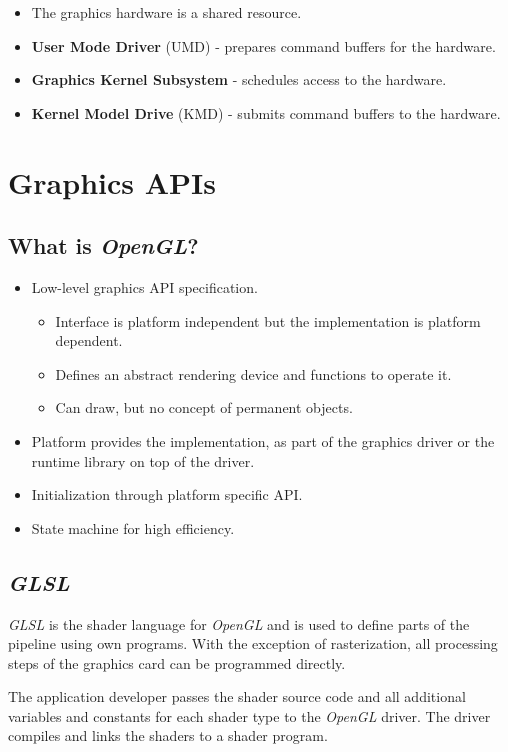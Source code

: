 \documentclass[11pt]{article}
\begin{document}
\begin{itemize}
  \item The graphics hardware is a shared resource.
  \item \textbf{User Mode Driver} (UMD) - prepares command buffers for the hardware.
  \item \textbf{Graphics Kernel Subsystem} - schedules access to the hardware.
  \item \textbf{Kernel Model Drive} (KMD) - submits command buffers to the hardware.
\end{itemize}

\section{Graphics APIs}
\subsection{What is \textit{OpenGL}?}
\begin{itemize}
  \item Low-level graphics API specification.
    \begin{itemize}
      \item Interface is platform independent but the implementation is platform dependent.
      \item Defines an abstract rendering device and functions to operate it.
      \item Can draw, but no concept of permanent objects.
    \end{itemize}
  \item Platform provides the implementation, as part of the graphics driver or the runtime library on top of the driver.
  \item Initialization through platform specific API.
  \item State machine for high efficiency.
\end{itemize}

\subsection{\textit{GLSL}}
\textit{GLSL} is the shader language for \textit{OpenGL} and is used to define parts of the pipeline using own programs.
With the exception of rasterization, all processing steps of the graphics card can be programmed directly.

The application developer passes the shader source code and all additional variables and constants for each shader type to the \textit{OpenGL} driver.
The driver compiles and links the shaders to a shader program.
\end{document}
